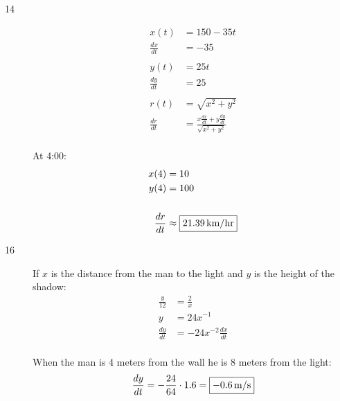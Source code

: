\documentclass[letterpaper, landscape]{exam}
\begin{document}
\begin{description}
    \item[14]
      \begin{align*}
        x(t)          & = 150 - 35 t \\
        \frac{dx}{dt} & = -35 \\
        \\
        y(t)          & = 25 t \\
        \frac{dy}{dt} & = 25 \\
        \\
        r(t)          & = \sqrt{x^2 + y^2} \\
        \frac{dr}{dt} & = \frac{x \frac{dx}{dt} + y \frac{dy}{dt}}{\sqrt{x^2 + y^2}} \\
      \end{align*}

      At 4:00:
      \begin{align*}
        x(4)          & = 10 \\
        y(4)          & = 100 \\
        \\
        \frac{dr}{dt} & \approx \boxed{ \unit[21.39]{km/hr} }
      \end{align*}

    \newpage

    \item[16]
      If $x$ is the distance from the man to the light and $y$ is the height of the shadow:
      \begin{align*}
        \frac{y}{12}  & = \frac{2}{x} \\
        y             & = 24 x^{-1} \\
        \frac{dy}{dt} & = -24 x^{-2} \frac{dx}{dt} \\
      \end{align*}

      When the man is 4 meters from the wall he is 8 meters from the light:
      \[
        \frac{dy}{dt} = - \frac{24}{64} \cdot 1.6 = \boxed{ \unit[-0.6]{m/s} }
      \]



\end{description}
\end{document}

